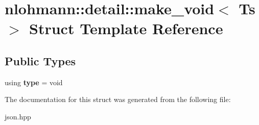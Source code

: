 \hypertarget{structnlohmann_1_1detail_1_1make__void}{}\section{nlohmann\+:\+:detail\+:\+:make\+\_\+void$<$ Ts $>$ Struct Template Reference}
\label{structnlohmann_1_1detail_1_1make__void}
\subsection*{Public Types}
\begin{DoxyCompactItemize}
\item 
\mbox{\label{structnlohmann_1_1detail_1_1make__void_a8961e24ae3b2cb65ec47d1ce805d94e4}} 
using {\bfseries type} = void
\end{DoxyCompactItemize}


The documentation for this struct was generated from the following file\+:\begin{DoxyCompactItemize}
\item 
json.\+hpp\end{DoxyCompactItemize}
